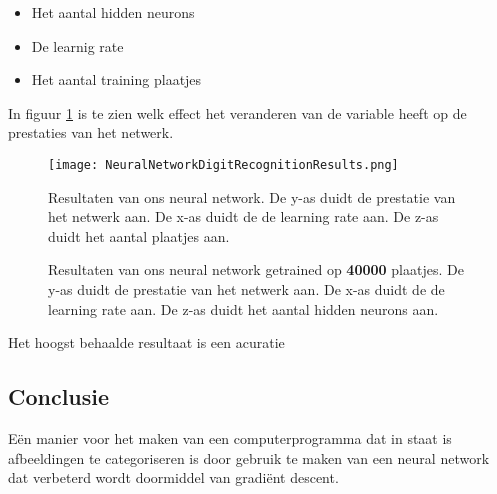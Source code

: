 \begin{itemize}
  \item Het aantal hidden neurons
  \item De learnig rate
  \item Het aantal training plaatjes
\end{itemize}

In figuur \ref{fig:NNXOR} is te zien welk effect het veranderen van de variable heeft op de prestaties van het netwerk.

\begin{figure}[H]
  \centering
    \texttt{[image: NeuralNetworkDigitRecognitionResults.png]}
  \caption{Resultaten van ons neural network.
  De y-as duidt de prestatie van het netwerk aan.
  De x-as duidt de de learning rate aan.
  De z-as duidt het aantal plaatjes aan.}
  \label{fig:NNXOR}
\end{figure}

\begin{figure}[H]
\caption{Resultaten van ons neural network getrained op \textbf{40000} plaatjes. 
De y-as duidt de prestatie van het netwerk aan. 
De x-as duidt de de learning rate aan. 
De z-as duidt het aantal hidden neurons aan.}
\end{figure}

Het hoogst behaalde resultaat is een acuratie 

\subsection{Conclusie}
E\"en manier voor het maken van een computerprogramma dat in staat is afbeeldingen te categoriseren is door gebruik te maken van een neural network dat verbeterd wordt doormiddel van gradi\"ent descent.
